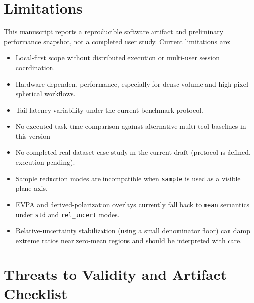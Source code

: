 \documentclass[11pt]{article}
\begin{document}
\section{Limitations}
This manuscript reports a reproducible software artifact and preliminary performance snapshot, not a completed user study. Current limitations are:
\begin{itemize}[leftmargin=1.5em]
  \item Local-first scope without distributed execution or multi-user session coordination.
  \item Hardware-dependent performance, especially for dense volume and high-pixel spherical workflows.
  \item Tail-latency variability under the current benchmark protocol.
  \item No executed task-time comparison against alternative multi-tool baselines in this version.
  \item No completed real-dataset case study in the current draft (protocol is defined, execution pending).
  \item Sample reduction modes are incompatible when \texttt{sample} is used as a visible plane axis.
  \item EVPA and derived-polarization overlays currently fall back to \texttt{mean} semantics under \texttt{std} and \texttt{rel\_uncert} modes.
  \item Relative-uncertainty stabilization (using a small denominator floor) can damp extreme ratios near zero-mean regions and should be interpreted with care.
\end{itemize}

\section{Threats to Validity and Artifact Checklist}
\end{document}
